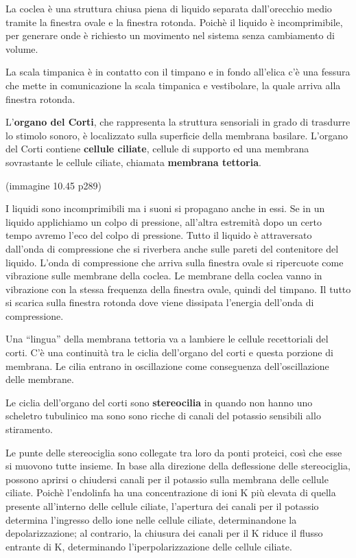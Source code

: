 \documentclass[]{article}
\begin{document}
La coclea è una struttura chiusa piena di liquido separata dall'orecchio
medio tramite la finestra ovale e la finestra rotonda. Poichè il liquido
è incomprimibile, per generare onde è richiesto un movimento nel sistema
senza cambiamento di volume.

La scala timpanica è in contatto con il timpano e in fondo all'elica c'è
una fessura che mette in comunicazione la scala timpanica e vestibolare,
la quale arriva alla finestra rotonda.

L'\textbf{organo del Corti}, che rappresenta la struttura sensoriali in
grado di trasdurre lo stimolo sonoro, è localizzato sulla superficie
della membrana basilare. L'organo del Corti contiene \textbf{cellule
ciliate}, cellule di supporto ed una membrana sovrastante le cellule
ciliate, chiamata \textbf{membrana tettoria}.

(immagine 10.45 p289)

I liquidi sono incomprimibili ma i suoni si propagano anche in essi. Se
in un liquido applichiamo un colpo di pressione, all'altra estremità
dopo un certo tempo avremo l'eco del colpo di pressione. Tutto il
liquido è attraversato dall'onda di compressione che si riverbera anche
sulle pareti del contenitore del liquido. L'onda di compressione che
arriva sulla finestra ovale si ripercuote come vibrazione sulle membrane
della coclea. Le membrane della coclea vanno in vibrazione con la stessa
frequenza della finestra ovale, quindi del timpano. Il tutto si scarica
sulla finestra rotonda dove viene dissipata l'energia dell'onda di
compressione.

Una ``lingua'' della membrana tettoria va a lambiere le cellule
recettoriali del corti. C'è una continuità tra le ciclia dell'organo del
corti e questa porzione di membrana. Le cilia entrano in oscillazione
come conseguenza dell'oscillazione delle membrane.

Le ciclia dell'organo del corti sono \textbf{stereocilia} in quando non
hanno uno scheletro tubulinico ma sono sono ricche di canali del
potassio sensibili allo stiramento.

Le punte delle stereociglia sono collegate tra loro da ponti proteici,
così che esse si muovono tutte insieme. In base alla direzione della
deflessione delle stereociglia, possono aprirsi o chiudersi canali per
il potassio sulla membrana delle cellule ciliate. Poichè l'endolinfa ha
una concentrazione di ioni K più elevata di quella presente all'interno
delle cellule ciliate, l'apertura dei canali per il potassio determina
l'ingresso dello ione nelle cellule ciliate, determinandone la
depolarizzazione; al contrario, la chiusura dei canali per il K riduce
il flusso entrante di K, determinando l'iperpolarizzazione delle cellule
ciliate.
\end{document}
